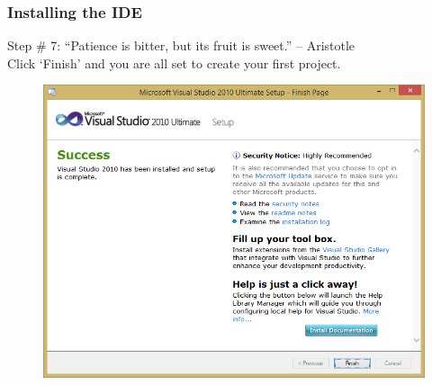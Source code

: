 \documentclass{beamer}
\begin{document}
\begin{frame}
    \frametitle{Installing the IDE}
    Step \# 7: ``Patience is bitter, but its fruit is sweet.'' -- Aristotle \\
    Click `Finish' and you are all set to create your first project.
    \begin{figure}
        \centering
        \includegraphics[scale=0.39]{step_6}
    \end{figure}
\end{frame}
\end{document}
